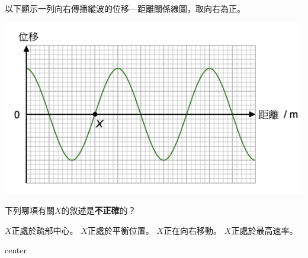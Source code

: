 {
    以下顯示一列向右傳播縱波的位移—距離關係線圖，取向右為正。
    \par{\par\centering\includegraphics[width=.5\textwidth]{./img/ch1_earlyclass_wave_mc_2024-05-13-16-22-56.png}\par}
    下列哪項有關$X$的敘述是\textbf{不正確}的？
    \begin{tasks}
        \task $X$正處於疏部中心。
        \task $X$正處於平衡位置。
        \task $X$正在向右移動。
        \task $X$正處於最高速率。
    \end{tasks}

}{center}
